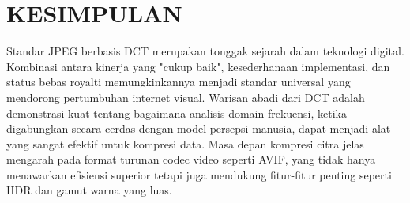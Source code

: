 \documentclass[a4paper]{article}
\begin{document}
\section{KESIMPULAN}
Standar JPEG berbasis DCT merupakan tonggak sejarah dalam teknologi digital. Kombinasi antara kinerja yang "cukup baik", kesederhanaan implementasi, dan status bebas royalti memungkinkannya menjadi standar universal yang mendorong pertumbuhan internet visual. Warisan abadi dari DCT adalah demonstrasi kuat tentang bagaimana analisis domain frekuensi, ketika digabungkan secara cerdas dengan model persepsi manusia, dapat menjadi alat yang sangat efektif untuk kompresi data. Masa depan kompresi citra jelas mengarah pada format turunan codec video seperti AVIF, yang tidak hanya menawarkan efisiensi superior tetapi juga mendukung fitur-fitur penting seperti HDR dan gamut warna yang luas.

\printbibliography
\end{document}
